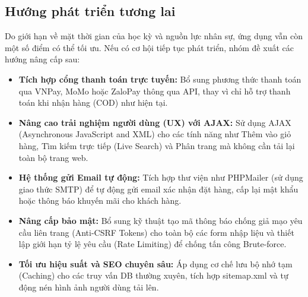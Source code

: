 \subsection{Hướng phát triển tương lai}
Do giới hạn về mặt thời gian của học kỳ và nguồn lực nhân sự, ứng dụng vẫn còn một số điểm có thể tối ưu. Nếu có cơ hội tiếp tục phát triển, nhóm đề xuất các hướng nâng cấp sau:
\begin{itemize}
    \item \textbf{Tích hợp cổng thanh toán trực tuyến:} Bổ sung phương thức thanh toán qua VNPay, MoMo hoặc ZaloPay thông qua API, thay vì chỉ hỗ trợ thanh toán khi nhận hàng (COD) như hiện tại.
    \item \textbf{Nâng cao trải nghiệm người dùng (UX) với AJAX:} Sử dụng AJAX (Asynchronous JavaScript and XML) cho các tính năng như Thêm vào giỏ hàng, Tìm kiếm trực tiếp (Live Search) và Phân trang mà không cần tải lại toàn bộ trang web.
    \item \textbf{Hệ thống gửi Email tự động:} Tích hợp thư viện như PHPMailer (sử dụng giao thức SMTP) để tự động gửi email xác nhận đặt hàng, cấp lại mật khẩu hoặc thông báo khuyến mãi cho khách hàng.
    \item \textbf{Nâng cấp bảo mật:} Bổ sung kỹ thuật tạo mã thông báo chống giả mạo yêu cầu liên trang (Anti-CSRF Tokens) cho toàn bộ các form nhập liệu và thiết lập giới hạn tỷ lệ yêu cầu (Rate Limiting) để chống tấn công Brute-force.
    \item \textbf{Tối ưu hiệu suất và SEO chuyên sâu:} Áp dụng cơ chế lưu bộ nhớ tạm (Caching) cho các truy vấn DB thường xuyên, tích hợp sitemap.xml và tự động nén hình ảnh người dùng tải lên.
\end{itemize}
